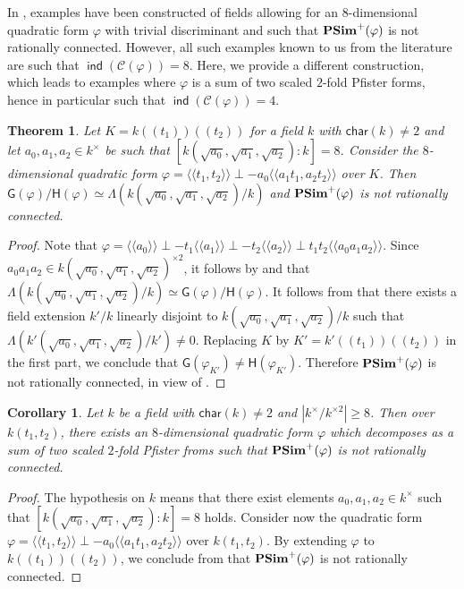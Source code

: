 \documentclass[twoside,11pt]{amsart}
\numberwithin{equation}{section}
\newtheorem{thm}[equation]{Theorem}
\newtheorem{cor}[equation]{Corollary}
\theoremstyle{definition}
\newcommand\ind{\operatorname{\mathsf{ind}}}
\newcommand{\car}{\mathsf{char}}
\newcommand{\vf}{\varphi}
\newcommand{\mg}[1]{{#1}^{\times}}
\newcommand{\sq}[1]{{#1}^{\times 2}}
\newcommand{\scg}[1]{\mg{#1}/\sq{#1}}
\newcommand{\la}{\langle}
\newcommand{\ra}{\rangle}
\newcommand{\lla}{\la\!\la}
\newcommand{\rra}{\ra\!\ra}
\renewcommand{\geq}{\geqslant}
\newcommand{\mc}{\mathcal}
\newcommand{\G}{\mathsf{G}}
\renewcommand{\H}{\mathsf{H}}
\renewcommand{\geq}{\geqslant}
\begin{document}
In \cite{Gil97}, examples have been constructed of fields allowing for an $8$-dimensional quadratic form $\varphi$ with  trivial discriminant and such that ${\bf PSim}^+(\varphi)$ is not rationally connected.
However, all such examples known to us from the literature are such that $\ind(\mc{C}(\varphi))=8$.
Here, we provide a different construction, which leads to examples where $\vf$ is a sum of two scaled $2$-fold Pfister forms, hence in particular such that
$\ind(\mc{C}(\varphi))=4$.


\begin{thm}\label{8I2index4ex}
    Let $K=k(\!(t_1)\!)(\!(t_2)\!)$ for a field $k$ with $\car(k)\neq 2$ and
     let $a_0,a_1,a_2\in\mg{k}$ be such that $[k(\sqrt{a_0},\sqrt{a_1},\sqrt{a_2}):k]=8$.
     Consider the $8$-dimensional quadratic form 
     $\vf=\lla t_1,t_2\rra\perp -a_0\lla a_1t_1,a_2t_2\rra$ over $K$.
     Then $\G(\vf)/\H(\vf)\simeq \Lambda(k(\sqrt{a_0},\sqrt{a_1},\sqrt{a_2})/k)$ and ${\bf PSim}^+(\vf)$ is not rationally connected.
\end{thm}
\begin{proof}
     Note that $\vf=\lla a_0\rra\perp -t_1\lla a_1\rra\perp -t_2\lla a_2\rra\perp t_1t_2\lla a_0a_1a_2\rra$.
    Since $a_0a_1a_2\in\sq{k(\sqrt{a_0},\sqrt{a_1},\sqrt{a_2})}$, it follows by  and  that $\Lambda(k(\sqrt{a_0},\sqrt{a_1},\sqrt{a_2})/k)\simeq \G(\vf)/\H(\vf)$.
    It follows from  that there exists a field extension $k'/k$ linearly disjoint to $k(\sqrt{a_0},\sqrt{a_1},\sqrt{a_2})/k$ such that $\Lambda(k'(\sqrt{a_0},\sqrt{a_1},\sqrt{a_2})/k')\neq 0$.
    Replacing $K$ by $K'=k'(\!(t_1)\!)(\!(t_2)\!)$ in the first part, we conclude that $\G(\vf_{K'})\neq \H(\vf_{K'})$.
    Therefore ${\bf PSim}^+(\vf)$ is not rationally connected, in view of .
\end{proof}

\begin{cor}\label{8I2-followup}
    Let $k$ be a field with $\car(k)\neq 2$ and $|\scg{k}|\geq 8$. Then over $k(t_1,t_2)$, there exists an $8$-dimensional quadratic form $\vf$ which decomposes as a sum of two scaled $2$-fold Pfister froms such that ${\bf PSim}^+(\vf)$ is not rationally connected.
\end{cor}
\begin{proof}
       The hypothesis on $k$ means that there exist elements $a_0,a_1,a_2\in \mg{k}$ such that $[k(\sqrt{a_0},\sqrt{a_1},\sqrt{a_2}):k]=8$ holds.
    Consider now the quadratic form 
    $\vf=\lla t_1,t_2\rra\perp -a_0\lla a_1t_1,a_2t_2\rra$ over $k(t_1,t_2)$.
    By extending $\vf$ to $k(\!(t_1)\!)(\!(t_2)\!)$, we conclude from  that ${\bf PSim}^+(\vf)$ is not rationally connected.
\end{proof}
\end{document}
